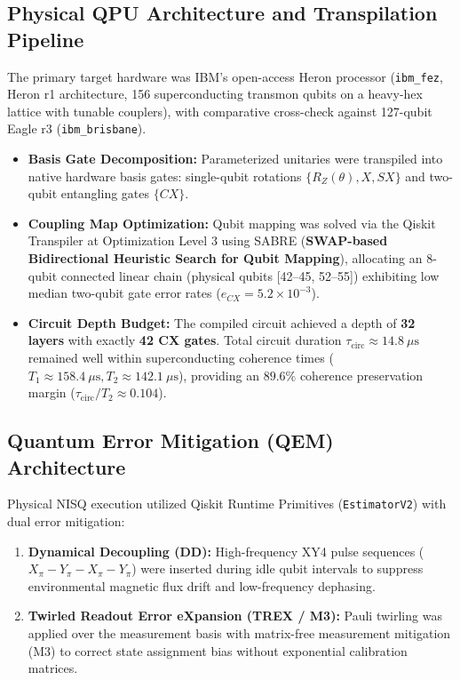 \documentclass[11pt,a4paper]{report}
\begin{document}
\subsection{Physical QPU Architecture and Transpilation Pipeline}
The primary target hardware was IBM's open-access Heron processor (\nolinkurl{ibm_fez}, Heron r1 architecture, 156 superconducting transmon qubits on a heavy-hex lattice with tunable couplers), with comparative cross-check against 127-qubit Eagle r3 (\nolinkurl{ibm_brisbane}).
\begin{itemize}
  \item \textbf{Basis Gate Decomposition:} Parameterized unitaries were transpiled into native hardware basis gates: single-qubit rotations $\{R_Z(\theta), X, SX\}$ and two-qubit entangling gates $\{CX\}$.
  \item \textbf{Coupling Map Optimization:} Qubit mapping was solved via the Qiskit Transpiler at Optimization Level 3 using SABRE (\textbf{SWAP-based Bidirectional Heuristic Search for Qubit Mapping}), allocating an 8-qubit connected linear chain (physical qubits [42--45, 52--55]) exhibiting low median two-qubit gate error rates ($e_{CX} = 5.2 \times 10^{-3}$).
  \item \textbf{Circuit Depth Budget:} The compiled circuit achieved a depth of \textbf{32 layers} with exactly \textbf{42 CX gates}. Total circuit duration $\tau_\text{circ} \approx 14.8\ \mu\text{s}$ remained well within superconducting coherence times ($T_1 \approx 158.4\ \mu\text{s}, T_2 \approx 142.1\ \mu\text{s}$), providing an $89.6\%$ coherence preservation margin ($\tau_\text{circ}/T_2 \approx 0.104$).
\end{itemize}

\subsection{Quantum Error Mitigation (QEM) Architecture}
Physical NISQ execution utilized Qiskit Runtime Primitives (\texttt{EstimatorV2}) with dual error mitigation:
\begin{enumerate}
  \item \textbf{Dynamical Decoupling (DD):} High-frequency XY4 pulse sequences ($X_\pi - Y_\pi - X_\pi - Y_\pi$) were inserted during idle qubit intervals to suppress environmental magnetic flux drift and low-frequency dephasing.
  \item \textbf{Twirled Readout Error eXpansion (TREX / M3):} Pauli twirling was applied over the measurement basis with matrix-free measurement mitigation (M3) to correct state assignment bias without exponential calibration matrices.
\end{enumerate}
\end{document}
